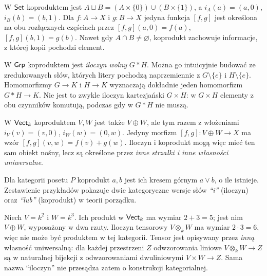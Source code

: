 \begin{przyklad}
W $\mathsf{Set}$ koproduktem jest $A\sqcup B=(A\times\{0\})\cup(B\times\{1\})$, a $i_A(a)=(a,0)$, $i_B(b)=(b,1)$. Dla $f:A\to X$ i $g:B\to X$ jedyna funkcja $[f,g]$ jest określona na obu rozłącznych częściach przez $[f,g](a,0)=f(a)$, $[f,g](b,1)=g(b)$. Nawet gdy $A\cap B\neq\varnothing$, koprodukt zachowuje informacje, z której kopii pochodzi element.
\end{przyklad}

\begin{przyklad}
W $\mathsf{Grp}$ koproduktem jest \emph{iloczyn wolny} $G*H$. Można go intuicyjnie budować ze zredukowanych słów, których litery pochodzą naprzemiennie z $G\setminus\{e\}$ i $H\setminus\{e\}$. Homomorfizmy $G\to K$ i $H\to K$ wyznaczają dokładnie jeden homomorfizm $G*H\to K$. Nie jest to zwykle iloczyn kartezjański $G\times H$: w $G\times H$ elementy z obu czynników komutują, podczas gdy w $G*H$ nie muszą.
\end{przyklad}

\begin{przyklad}
W $\mathsf{Vect}_k$ koproduktem $V,W$ jest także $V\oplus W$, ale tym razem z włożeniami $i_V(v)=(v,0)$, $i_W(w)=(0,w)$. Jedyny morfizm $[f,g]:V\oplus W\to X$ ma wzór $[f,g](v,w)=f(v)+g(w)$. Iloczyn i koprodukt mogą więc mieć ten sam obiekt nośny, lecz są określone przez \emph{inne strzałki i inne własności uniwersalne}.
\end{przyklad}

\begin{przyklad}
Dla kategorii posetu $P$ koprodukt $a,b$ jest ich kresem górnym $a\vee b$, o ile istnieje. Zestawienie przykładów pokazuje dwie kategoryczne wersje słów \emph{``i''} (iloczyn) oraz \emph{``lub''} (koprodukt) w teorii porządku.
\end{przyklad}


\begin{przyklad}
Niech $V=k^2$ i $W=k^3$. Ich produkt w $\mathsf{Vect}_k$ ma wymiar $2+3=5$; jest nim $V\oplus W$, wyposażony w dwa rzuty. Iloczyn tensorowy $V\otimes_k W$ ma wymiar $2\cdot3=6$, więc nie może być produktem w tej kategorii. Tensor jest opisywany przez \emph{inną} własność uniwersalną: dla każdej przestrzeni $Z$ odwzorowania liniowe $V\otimes_k W\to Z$ są w naturalnej bijekcji z odwzorowaniami dwuliniowymi $V\times W\to Z$. Sama nazwa ``iloczyn'' nie przesądza zatem o konstrukcji kategorialnej.
\end{przyklad}

